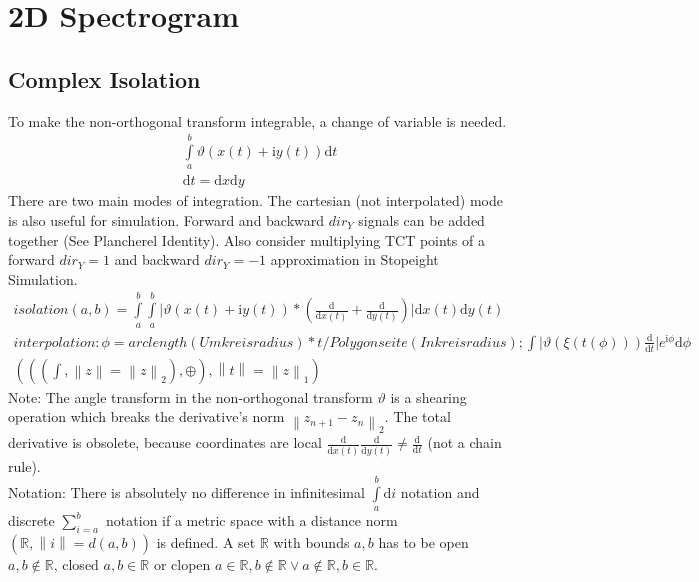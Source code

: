 \documentclass{report}
\newcommand\norm[1]{\left\lVert#1\right\rVert}
\begin{document}
\section{2D Spectrogram}
\subsection{Complex Isolation}
To make the non-orthogonal transform integrable, a change of variable is needed.
\begin{align}
\int \limits _{a}^{b} \vartheta (x(t)+\mathrm{i}y(t)) \mathrm{d}t\\
\mathrm{d} t = \mathrm{d}x \mathrm{d}y
\end{align}
There are two main modes of integration. The cartesian (not interpolated) mode is also useful for simulation. Forward and backward $dir_{Y}$ signals can be added together (See Plancherel Identity). Also consider multiplying TCT points of a forward $dir_{Y}=1$ and backward $dir_{Y}=-1$ approximation in Stopeight Simulation.
\begin{align}
isolation(a,b)=\int \limits _{a}^{b} \int \limits _{a}^{b} \lvert \vartheta (x(t)+\mathrm{i}y(t)) * (\frac{\mathrm{d}}{\mathrm{d}x(t)}+\frac{\mathrm{d}}{\mathrm{d}y(t)}) \rvert \mathrm{d}x(t) \mathrm{d}y(t)\\
interpolation: \phi = arclength(Umkreisradius)*t/Polygonseite(Inkreisradius); \int \lvert \vartheta (\xi (t(\phi)))\frac{\mathrm{d}}{\mathrm{d}t} \rvert e^{\mathrm{i}\phi}\mathrm{d}\phi\\
(((\int,\norm{z}=\norm{z}_2),\oplus),\norm{t}=\norm{z}_1)
\end{align}
Note: The angle transform in the non-orthogonal transform $\vartheta$ is a shearing operation which breaks the derivative's norm $\norm{z_{n+1}-z_{n}}_2$. The total derivative is obsolete, because coordinates are local $\frac{\mathrm{d}}{\mathrm{d} x(t)}\frac{\mathrm{d}}{\mathrm{d} y(t)}\not = \frac{\mathrm{d}}{\mathrm{d}t}$ (not a chain rule).\\
Notation: There is absolutely no difference in infinitesimal $\int \limits _{a}^{b} \mathrm{d}i$ notation and discrete $\sum  \limits _{i=a}^{b}$ notation if a metric space with a distance norm $(\mathbb{R},\norm{i}=d(a,b))$ is defined. A set $\mathbb{R}$ with bounds $a,b$ has to be open $a,b \not \in \mathbb{R}$, closed $a,b \in \mathbb{R}$ or clopen $a \in \mathbb{R}, b \not \in \mathbb{R} \lor a \not \in \mathbb{R},b \in \mathbb{R}$.\\\\
\end{document}
